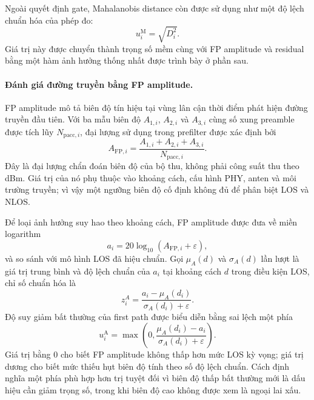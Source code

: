 \documentclass[
  a4paper,
]{report}
\begin{document}
Ngoài quyết định gate, Mahalanobis distance còn được sử dụng như một
độ lệch chuẩn hóa của phép đo:
\begin{equation}
  u_i^{\mathrm{M}}=\sqrt{D_i^2}.
  \label{eq:mahalanobis-standardized-deviation}
\end{equation}
Giá trị này được chuyển thành trọng số mềm cùng với FP amplitude và residual
bằng một hàm ảnh hưởng thống nhất được trình bày ở phần sau.

\paragraph{Đánh giá đường truyền bằng FP amplitude.}

FP amplitude mô tả biên độ tín hiệu tại vùng lân cận thời điểm phát hiện đường
truyền đầu tiên. Với ba mẫu biên độ $A_{1,i}$, $A_{2,i}$ và $A_{3,i}$ cùng số
xung preamble được tích lũy $N_{\mathrm{pacc},i}$, đại lượng sử dụng trong
prefilter được xác định bởi
\begin{equation}
  A_{\mathrm{FP},i}=
  \frac{A_{1,i}+A_{2,i}+A_{3,i}}{N_{\mathrm{pacc},i}}.
  \label{eq:first-path-amplitude}
\end{equation}
Đây là đại lượng chẩn đoán biên độ của bộ thu, không phải công suất thu theo
dBm. Giá trị của nó phụ thuộc vào khoảng cách, cấu hình PHY, anten và môi
trường truyền; vì vậy một ngưỡng biên độ cố định không đủ để phân biệt LOS và
NLOS.

Để loại ảnh hưởng suy hao theo khoảng cách, FP amplitude được đưa về miền
logarithm
\begin{equation}
  a_i=20\log_{10}(A_{\mathrm{FP},i}+\varepsilon),
  \label{eq:fp-amplitude-log-domain}
\end{equation}
và so sánh với mô hình LOS đã hiệu chuẩn. Gọi $\mu_A(d)$ và $\sigma_A(d)$ lần
lượt là giá trị trung bình và độ lệch chuẩn của $a_i$ tại khoảng cách $d$ trong
điều kiện LOS, chỉ số chuẩn hóa là
\begin{equation}
  z_i^{A}=\frac{a_i-\mu_A(d_i)}{\sigma_A(d_i)+\varepsilon}.
  \label{eq:fp-amplitude-standard-score}
\end{equation}
Độ suy giảm bất thường của first path được biểu diễn bằng sai lệch một
phía
\begin{equation}
  u_i^{\mathrm{A}}=
  \max\!\left(0,
  \frac{\mu_A(d_i)-a_i}{\sigma_A(d_i)+\varepsilon}\right).
  \label{eq:fp-amplitude-standardized-deviation}
\end{equation}
Giá trị bằng 0 cho biết FP amplitude không thấp hơn mức LOS kỳ vọng; giá trị
dương cho biết mức thiếu hụt biên độ tính theo số độ lệch chuẩn. Cách định
nghĩa một phía phù hợp hơn trị tuyệt đối vì biên độ thấp bất thường mới là dấu
hiệu cần giảm trọng số, trong khi biên độ cao không được xem là ngoại lai xấu.
\end{document}

